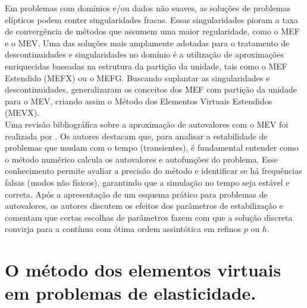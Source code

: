 \indent Em problemas com domínios e/ou dados não suaves, as soluções de problemas elípticos podem conter singularidades fracas. Essas singularidades pioram a taxa de convergência de métodos que assumem uma maior regularidade, como o MEF e o MEV. Uma das soluções mais amplamente adotadas para o tratamento de descontinuidades e singularidades no domínio é a utilização de aproximações enriquecidas baseadas na estrutura da partição da unidade, tais como o MEF Estendido (MEFX) ou o MEFG. Buscando suplantar as singularidades e descontinuidades, \citet{extendedvirtualelementmethodlaplaceproblemsingularitiesdiscontinuities2019a} generalizaram os conceitos dos MEF com partição da unidade para o MEV, criando assim o Método dos Elementos Virtuais Estendidos (MEVX). \\
\indent Uma revisão bibliográfica sobre a aproximação de autovalores com o MEV foi realizada por \citet{virtualelementapproximationeigenvalueproblems2022a}. Os autores destacam que, para analisar a estabilidade de problemas que mudam com o tempo (transientes), é fundamental entender como o método numérico calcula os autovalores e autofunções do problema. Esse conhecimento permite avaliar a precisão do método e identificar se há frequências falsas (modos não físicos), garantindo que a simulação no tempo seja estável e correta. Após a apresentação de um esquema prático para problemas de autovalores, os autores discutem os efeitos dos parâmetros de estabilização e comentam que certas escolhas de parâmetros fazem com que a solução discreta convirja para a contínua com ótima ordem assintótica em refinos $p$ ou $h$. 

\section{O método dos elementos virtuais em problemas de elasticidade.}

